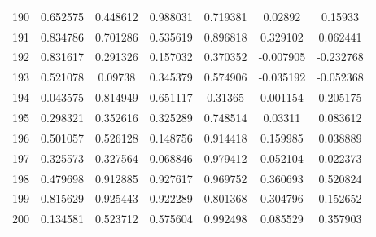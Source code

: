 \begin{table}
\begin{tabular}{c|c|c|c|c|c|c}
190 & 0.652575 & 0.448612 & 0.988031 & 0.719381 & 0.02892 & 0.15933\\
191 & 0.834786 & 0.701286 & 0.535619 & 0.896818 & 0.329102 & 0.062441\\
192 & 0.831617 & 0.291326 & 0.157032 & 0.370352 & -0.007905 & -0.232768\\
193 & 0.521078 & 0.09738 & 0.345379 & 0.574906 & -0.035192 & -0.052368\\
194 & 0.043575 & 0.814949 & 0.651117 & 0.31365 & 0.001154 & 0.205175\\
195 & 0.298321 & 0.352616 & 0.325289 & 0.748514 & 0.03311 & 0.083612\\
196 & 0.501057 & 0.526128 & 0.148756 & 0.914418 & 0.159985 & 0.038889\\
197 & 0.325573 & 0.327564 & 0.068846 & 0.979412 & 0.052104 & 0.022373\\
198 & 0.479698 & 0.912885 & 0.927617 & 0.969752 & 0.360693 & 0.520824\\
199 & 0.815629 & 0.925443 & 0.922289 & 0.801368 & 0.304796 & 0.152652\\
200 & 0.134581 & 0.523712 & 0.575604 & 0.992498 & 0.085529 & 0.357903\\
\end{tabular}
\end{table}
\newpage
